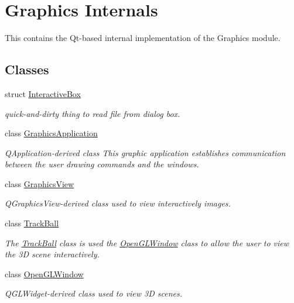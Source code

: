 \hypertarget{group___graphics_internal}{\section{Graphics Internals}
\label{group___graphics_internal}
}


This contains the Qt-\/based internal implementation of the Graphics module.  


\subsection*{Classes}
\begin{DoxyCompactItemize}
\item 
struct \hyperlink{struct_d_o_1_1_interactive_box}{Interactive\-Box}
\begin{DoxyCompactList}\small\item\em quick-\/and-\/dirty thing to read file from dialog box. \end{DoxyCompactList}\item 
class \hyperlink{class_d_o_1_1_graphics_application}{Graphics\-Application}
\begin{DoxyCompactList}\small\item\em Q\-Application-\/derived class This graphic application establishes communication between the user drawing commands and the windows. \end{DoxyCompactList}\item 
class \hyperlink{class_d_o_1_1_graphics_view}{Graphics\-View}
\begin{DoxyCompactList}\small\item\em Q\-Graphics\-View-\/derived class used to view interactively images. \end{DoxyCompactList}\item 
class \hyperlink{class_d_o_1_1_track_ball}{Track\-Ball}
\begin{DoxyCompactList}\small\item\em The \hyperlink{class_d_o_1_1_track_ball}{Track\-Ball} class is used the \hyperlink{class_d_o_1_1_open_g_l_window}{Open\-G\-L\-Window} class to allow the user to view the 3\-D scene interactively. \end{DoxyCompactList}\item 
class \hyperlink{class_d_o_1_1_open_g_l_window}{Open\-G\-L\-Window}
\begin{DoxyCompactList}\small\item\em Q\-G\-L\-Widget-\/derived class used to view 3\-D scenes. \end{DoxyCompactList}\item 

\end{DoxyCompactItemize}
